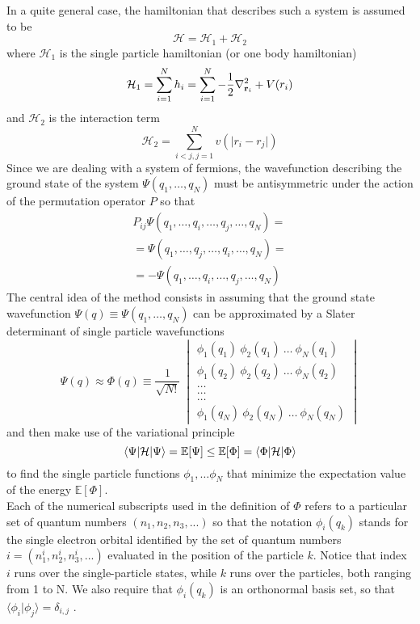 In a quite general case, the hamiltonian that describes such a system is assumed to be 
\begin{equation*}
    \mathcal{H} = \mathcal{H}_1 + \mathcal{H}_2
\end{equation*}
where $\mathcal{H}_1$ is the single particle hamiltonian (or one body hamiltonian)
\begin{equation*}
    \mathcal{H}_1 = \sum_{i=1}^N h_i = \sum_{i=1}^N -\frac{1}{2}\nabla_{\mathbf{r}_i}^2 + V(r_i)
\end{equation*}
and $\mathcal{H}_2$ is the interaction term
\begin{equation*}
    \mathcal{H}_2 = \sum_{i<j,j=1}^N v(\vert r_i-r_j \vert)
\end{equation*}
Since we are dealing with a system of fermions, the wavefunction describing the ground state of the system $\Psi(q_1, \dots, q_N)$ must be antisymmetric under the action of the permutation operator $P$ so that
\begin{gather*}
    P_{ij} \Psi(q_1, \dots,q_i, \dots, q_j, \dots, q_N) = \\
    = \Psi(q_1, \dots, q_j, \dots, q_i, \dots, q_N) = \\ 
    = - \Psi(q_1, \dots, q_i, \dots, q_j, \dots, q_N) 
\end{gather*}
The central idea of the method consists in assuming that the ground state wavefunction $\Psi(q) \equiv \Psi(q_1, \dots, q_N)$ can be approximated by a Slater determinant of single particle wavefunctions
\begin{equation*}
    \Psi(q) \approx \Phi(q) \equiv \frac{1}{\sqrt{N!}} \ \begin{vmatrix} \phi_{1}(q_1) \ \phi_{2}(q_1) \ \dots \ \phi_{N}(q_1) \\ 
    \phi_{1}(q_2) \ \phi_{2}(q_2) \ \dots \ \phi_{N}(q_2) \\
    \dots \\
    \dots \\
    \dots \\
    \phi_{1}(q_N) \ \phi_{2}(q_N) \ \dots \ \phi_{N}(q_N)
    \end{vmatrix}
\end{equation*}
and then make use of the variational principle
\begin{equation}
    \left\langle \Psi \middle| \mathcal{H} \middle| \Psi \right\rangle = \mathbb{E}[\Psi] \leq \mathbb{E}[\Phi] = \left\langle \Phi \middle| \mathcal{H} \middle| \Phi \right\rangle
    \label{eq:en_ground_slater_1}
\end{equation}
to find the single particle functions $\phi_{1}, \dots \phi_{N}$ that minimize the expectation value of the energy $\mathbb{E}[\Phi]$. \\ Each of the numerical subscripts used in the definition of $\Phi$ refers to a particular set of quantum numbers $(n_1, n_2, n_3, ...)$ so that the notation $\phi_{i}(q_k)$ stands for the single electron orbital identified by the set of quantum numbers $i = (n_1^i, n_2^i, n_3^i, ...)$ evaluated in the position of the particle $k$. Notice that index $i$ runs over the single-particle states, while $k$ runs over the particles, both ranging from 1 to N. We also require that ${\phi_{i}(q_k)}$ is an orthonormal basis set, so that $\langle \phi_{i}|\phi_{j}\rangle =\delta_{i, j} $ .

